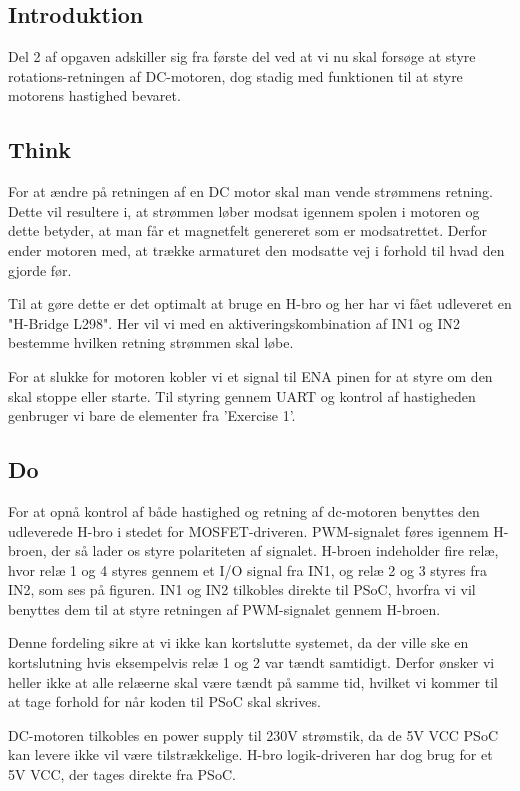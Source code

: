 \documentclass[../main.tex]{subfiles}
\begin{document}
\subsection{Introduktion}
Del 2 af opgaven adskiller sig fra første del ved at vi nu skal forsøge at styre rotations-retningen af DC-motoren, dog stadig med funktionen til at styre motorens hastighed bevaret.

\subsection{Think}
For at ændre på retningen af en DC motor skal man vende strømmens retning. 
Dette vil resultere i, at strømmen løber modsat igennem spolen i motoren og dette betyder, at man får et magnetfelt genereret som er modsatrettet.
Derfor ender motoren med, at trække armaturet den modsatte vej i forhold til hvad den gjorde før.

Til at gøre dette er det optimalt at bruge en H-bro og her har vi fået udleveret en "H-Bridge L298".
Her vil vi med en aktiveringskombination af IN1 og IN2 bestemme hvilken retning strømmen skal løbe.

For at slukke for motoren kobler vi et signal til ENA pinen for at styre om den skal stoppe eller starte. Til styring gennem UART og kontrol af hastigheden genbruger vi bare de elementer fra 'Exercise 1'.

\subsection{Do}
For at opnå kontrol af både hastighed og retning af dc-motoren benyttes den udleverede H-bro i stedet for MOSFET-driveren. PWM-signalet føres igennem H-broen, der så lader os styre polariteten af signalet. H-broen indeholder fire relæ, hvor relæ 1 og 4 styres gennem et I/O signal fra IN1, og relæ 2 og 3 styres fra IN2, som ses på figuren. IN1 og IN2 tilkobles direkte til PSoC, hvorfra vi vil benyttes dem til at styre retningen af PWM-signalet gennem H-broen.


Denne fordeling sikre at vi ikke kan kortslutte systemet, da der ville ske en kortslutning hvis eksempelvis relæ 1 og 2 var tændt samtidigt. Derfor ønsker vi heller ikke at alle relæerne skal være tændt på samme tid, hvilket vi kommer til at tage forhold for når koden til PSoC skal skrives. 

DC-motoren tilkobles en power supply til 230V strømstik, da de 5V VCC PSoC kan levere ikke vil være tilstrækkelige. H-bro logik-driveren har dog brug for et 5V VCC, der tages direkte fra PSoC.
\end{document}

